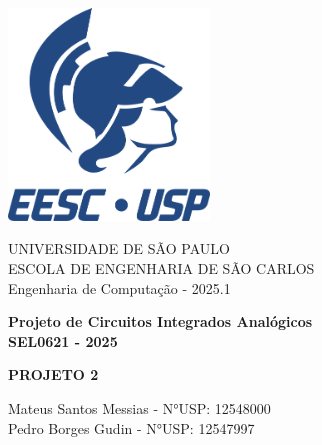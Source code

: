 ﻿\documentclass[12pt,a4paper]{article}
\newcommand{\imprimirMateria}{Projeto de Circuitos Integrados Analógicos}
\newcommand{\imprimirCodMateria}{SEL0621}
\newcommand{\imprimirTitulo}{Projeto 2}
\newcommand{\imprimirSubtitulo}{Engenharia de Computação}
\newcommand{\imprimirAutores}{Mateus Santos Messias - N°USP: 12548000 \\ Pedro Borges Gudin - N°USP: 12547997}
\newcommand{\imprimirAno}{2025}
\begin{document}
\hypersetup{pageanchor=false}

\begin{titlepage}
    \begin{center}
        \vspace*{0.5cm}
        \includegraphics[width=0.4\textwidth]{images/Logo EESC-USP - Vertical Monocromatico Azul (ECM).png}
            
        \Large
        \vspace{1cm}
        UNIVERSIDADE DE SÃO PAULO\\
        ESCOLA DE ENGENHARIA DE SÃO CARLOS\\
        \imprimirSubtitulo{} - \imprimirAno.1
        

        \vspace{2cm}
        \LARGE
        \textbf{
            \imprimirMateria{}\\
            \imprimirCodMateria{} - \imprimirAno
        }
        
        \vspace{3.5cm}
        \Huge
        \uppercase{\textbf{\imprimirTitulo}}
        
        \vfill
        
        \large
        \imprimirAutores
        
        \vspace{2cm}
        
    \end{center}
\end{titlepage}

\newpage

\begin{abstract}
Este trabalho apresenta o projeto e desenvolvimento de fontes de referência de corrente e tensão tipo bandgap utilizando tecnologia CMOS 0,35µm da AMS. O projeto aborda o estudo de transistores MOS operando em fraca inversão, técnicas de casamento de componentes e a implementação de circuitos de referência estáveis com a temperatura. Foi desenvolvida uma fonte de corrente de referência baseada em transistores em fraca inversão e espelhos de corrente, seguida pela implementação de uma fonte de tensão bandgap que combina grandezas PTAT (Proportional To Absolute Temperature) e CTAT (Complementary To Absolute Temperature) para obter coeficiente de temperatura inferior a 50 ppm/°C.
\end{abstract}
\end{document}
